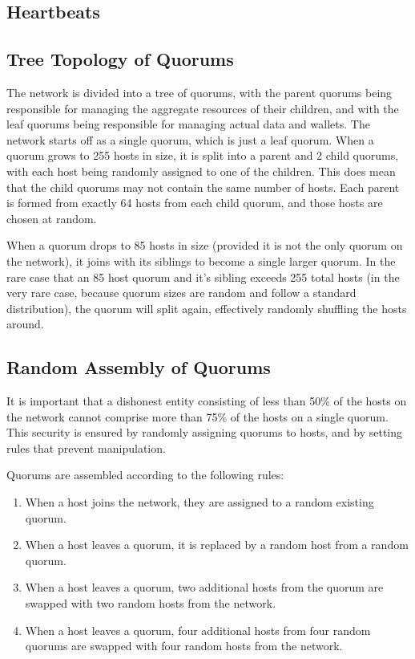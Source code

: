\documentclass[twocolumn]{article}
\begin{document}
\subsection{Heartbeats}

\subsection{Tree Topology of Quorums}
The network is divided into a tree of quorums, with the parent quorums being responsible for managing the aggregate resources of their children, and with the leaf quorums being responsible for managing actual data and wallets.
The network starts off as a single quorum, which is just a leaf quorum.
When a quorum grows to 255 hosts in size, it is split into a parent and 2 child quorums, with each host being randomly assigned to one of the children.
This does mean that the child quorums may not contain the same number of hosts.
Each parent is formed from exactly 64 hosts from each child quorum, and those hosts are chosen at random.

When a quorum drops to 85 hosts in size (provided it is not the only quorum on the network), it joins with its siblings to become a single larger quorum.
In the rare case that an 85 host quorum and it's sibling exceeds 255 total hosts (in the very rare case, because quorum sizes are random and follow a standard distribution), the quorum will split again, effectively randomly shuffling the hosts around.


\subsection{Random Assembly of Quorums}
It is important that a dishonest entity consisting of less than 50\% of the hosts on the network cannot comprise more than 75\% of the hosts on a single quorum.
This security is ensured by randomly assigning quorums to hosts, and by setting rules that prevent manipulation.

Quorums are assembled according to the following rules:
\begin{enumerate}
	\item When a host joins the network, they are assigned to a random existing quorum.
	\item When a host leaves a quorum, it is replaced by a random host from a random quorum.
	\item When a host leaves a quorum, two additional hosts from the quorum are swapped with two random hosts from the network.
	\item When a host leaves a quorum, four additional hosts from four random quorums are swapped with four random hosts from the network.
\end{enumerate}
\end{document}
